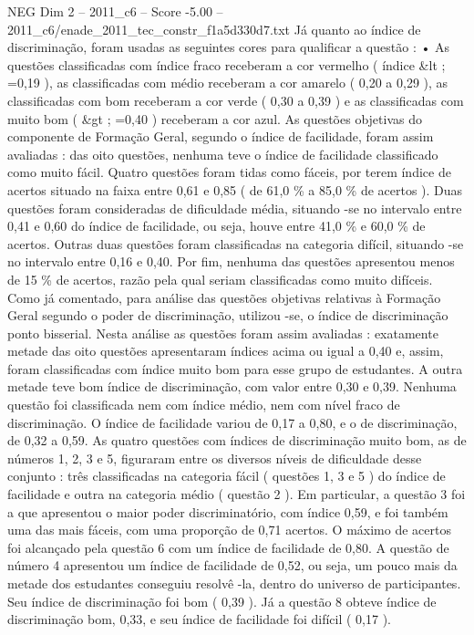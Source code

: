 \begin{textsample}{NEG Dim 2 – 2011\_c6 – Score -5.00 – 2011\_c6/enade\_2011\_tec\_constr\_f1a5d330d7.txt}
Já quanto ao índice de discriminação, foram usadas as seguintes cores para qualificar a questão : • As questões classificadas com índice fraco receberam a cor vermelho ( índice \&lt ; =0,19 ), as classificadas com médio receberam a cor amarelo ( 0,20 a 0,29 ), as classificadas com bom receberam a cor verde ( 0,30 a 0,39 ) e as classificadas com muito bom ( \&gt ; =0,40 ) receberam a cor azul.
As questões objetivas do componente de Formação Geral, segundo o índice de facilidade, foram assim avaliadas : das oito questões, nenhuma teve o índice de facilidade classificado como muito fácil.
Quatro questões foram tidas como fáceis, por terem índice de acertos situado na faixa entre 0,61 e 0,85 ( de 61,0 \% a 85,0 \% de acertos ).
Duas questões foram consideradas de dificuldade média, situando -se no intervalo entre 0,41 e 0,60 do índice de facilidade, ou seja, houve entre 41,0 \% e 60,0 \% de acertos.
Outras duas questões foram classificadas na categoria difícil, situando -se no intervalo entre 0,16 e 0,40.
Por fim, nenhuma das questões apresentou menos de 15 \% de acertos, razão pela qual seriam classificadas como muito difíceis.
Como já comentado, para análise das questões objetivas relativas à Formação Geral segundo o poder de discriminação, utilizou -se, o índice de discriminação ponto bisserial.
Nesta análise as questões foram assim avaliadas : exatamente metade das oito questões apresentaram índices acima ou igual a 0,40 e, assim, foram classificadas com índice muito bom para esse grupo de estudantes.
A outra metade teve bom índice de discriminação, com valor entre 0,30 e 0,39.
Nenhuma questão foi classificada nem com índice médio, nem com nível fraco de discriminação.
O índice de facilidade variou de 0,17 a 0,80, e o de discriminação, de 0,32 a 0,59.
As quatro questões com índices de discriminação muito bom, as de números 1, 2, 3 e 5, figuraram entre os diversos níveis de dificuldade desse conjunto : três classificadas na categoria fácil ( questões 1, 3 e 5 ) do índice de facilidade e outra na categoria médio ( questão 2 ).
Em particular, a questão 3 foi a que apresentou o maior poder discriminatório, com índice 0,59, e foi também uma das mais fáceis, com uma proporção de 0,71 acertos.
O máximo de acertos foi alcançado pela questão 6 com um índice de facilidade de 0,80.
A questão de número 4 apresentou um índice de facilidade de 0,52, ou seja, um pouco mais da metade dos estudantes conseguiu resolvê -la, dentro do universo de participantes.
Seu índice de discriminação foi bom ( 0,39 ).
Já a questão 8 obteve índice de discriminação bom, 0,33, e seu índice de facilidade foi difícil ( 0,17 ).

\end{textsample}
